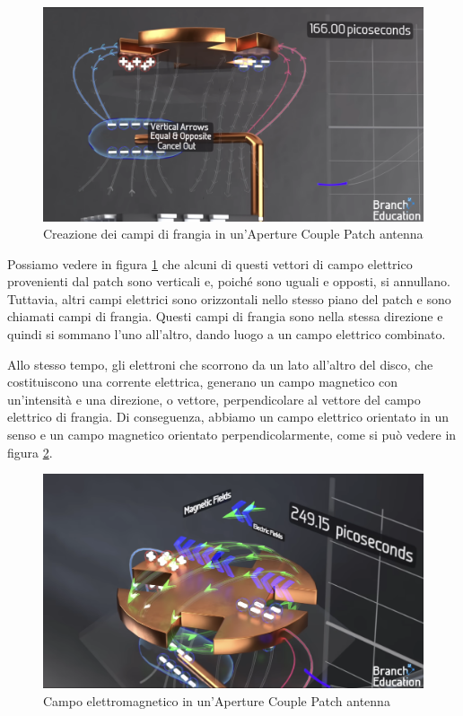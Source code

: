 \begin{figure}[htbp]
  \centering
  \includegraphics[width=0.8\linewidth]{./res/img/antenna_fringing_fields.png}
  \caption{Creazione dei campi di frangia in un'Aperture Couple Patch antenna \cite{branch_education_how_2022}}
  \label{fig:aperture-couple-patch-antenna-fringing-fields}
\end{figure}

Possiamo vedere in figura \ref{fig:aperture-couple-patch-antenna-fringing-fields} che alcuni di questi vettori di campo elettrico provenienti dal patch sono verticali e, poiché sono uguali e opposti, si annullano.
Tuttavia, altri campi elettrici sono orizzontali nello stesso piano del patch e sono chiamati campi di frangia.
Questi campi di frangia sono nella stessa direzione e quindi si sommano l'uno all'altro, dando luogo a un campo elettrico combinato.\cite{branch_education_how_2022}

Allo stesso tempo, gli elettroni che scorrono da un lato all'altro del disco, che costituiscono una corrente elettrica, generano un campo magnetico con un'intensità e una direzione, o vettore, perpendicolare al vettore del campo elettrico di frangia.
Di conseguenza, abbiamo un campo elettrico orientato in un senso e un campo magnetico orientato perpendicolarmente, come si può vedere in figura \ref{fig:aperture-couple-patch-antenna-em-field}.\cite{branch_education_how_2022}

\begin{figure}[htbp]
  \centering
  \includegraphics[width=0.8\linewidth]{./res/img/antenna_em_field.png}
  \caption{Campo elettromagnetico in un'Aperture Couple Patch antenna \cite{branch_education_how_2022}}
  \label{fig:aperture-couple-patch-antenna-em-field}
\end{figure}

